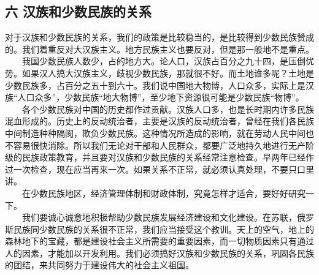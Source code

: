 \documentclass[cn,11pt,chinese]{elegantbook}
\def\myformat#1{\hfil\hfil #1}
\begin{document}
\subsection*{\myformat{六 汉族和少数民族的关系}}
对于汉族和少数民族的关系，我们的政策是比较稳当的，是比较得到少数民族赞成的。我们着重反对大汉族主义。地方民族主义也要反对，但是那一般地不是重点。\\
　　我国少数民族人数少，占的地方大。论人口，汉族占百分之九十四，是压倒优势。如果汉人搞大汉族主义，歧视少数民族，那就很不好。而土地谁多呢？土地是少数民族多，占百分之五十到六十。我们说中国地大物博，人口众多，实际上是汉族“人口众多”，少数民族“地大物博”，至少地下资源很可能是少数民族“物博”。\\
　　各个少数民族对中国的历史都作过贡献。汉族人口多，也是长时期内许多民族混血形成的。历史上的反动统治者，主要是汉族的反动统治者，曾经在我们各民族中间制造种种隔阂，欺负少数民族。这种情况所造成的影响，就在劳动人民中间也不容易很快消除。所以我们无论对干部和人民群众，都要广泛地持久地进行无产阶级的民族政策教育，并且要对汉族和少数民族的关系经常注意检查。早两年已经作过一次检查，现在应当再来一次。如果关系不正常，就必须认真处理，不要只口里讲。\\
　　在少数民族地区，经济管理体制和财政体制，究竟怎样才适合，要好好研究一下。\\
　　我们要诚心诚意地积极帮助少数民族发展经济建设和文化建设。在苏联，俄罗斯民族同少数民族的关系很不正常，我们应当接受这个教训。天上的空气，地上的森林地下的宝藏，都是建设社会主义所需要的重要因素，而一切物质因素只有通过人的因素，才能加以开发利用。我们必须搞好汉族和少数民族的关系，巩固各民族的团结，来共同努力于建设伟大的社会主义祖国。\\
\end{document}
